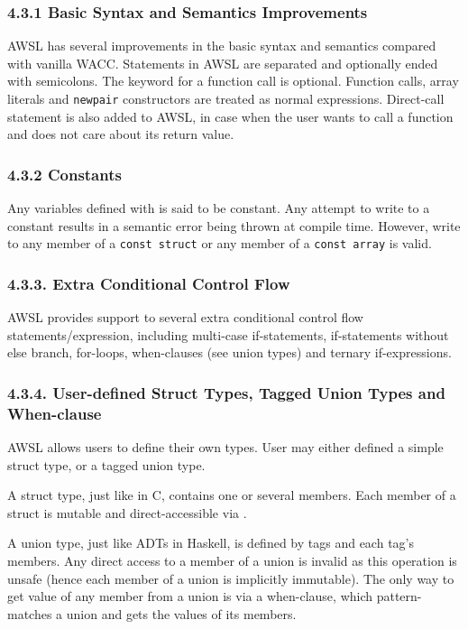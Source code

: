 \documentclass[10pt,a4paper]{report}
\begin{document}
  \subsubsection*{4.3.1 Basic Syntax and Semantics Improvements}
  AWSL has several improvements in the basic syntax and semantics compared with
  vanilla WACC. Statements in AWSL are separated and optionally ended with
  semicolons. The  keyword for a function call is optional.
  Function calls, array literals and \texttt{newpair} constructors are treated
  as normal expressions. Direct-call statement is also added to AWSL, in case
  when the user wants to call a function and does not
  care about its return value.

  \subsubsection*{4.3.2 Constants}
  Any variables defined with  is said to be constant. Any attempt
  to write to a constant results in a semantic error being thrown at compile
  time. However, write to any member of a \texttt{const struct} or any member of
  a \texttt{const array} is valid. 

  \subsubsection*{4.3.3. Extra Conditional Control Flow}
  AWSL provides support to several extra conditional control flow
  statements/expression, including multi-case if-statements, if-statements
  without else branch, for-loops, when-clauses (see union types) and ternary
  if-expressions. 

  \subsubsection*{4.3.4. User-defined Struct Types, Tagged Union Types and When-clause}
  AWSL allows users to define their own types. User may either defined a simple
  struct type, or a tagged union type.

  A struct type, just like  in C, contains one or several
  members. Each member of a struct is mutable and direct-accessible via
  .

  A union type, just like ADTs in Haskell, is defined by tags and each tag's
  members. Any direct access to a member of a union is invalid as this operation
  is unsafe (hence each member of a union is implicitly immutable). The only way
  to get value of any member from a union is via a when-clause, which
  pattern-matches a union and gets the values of its members.
\end{document}
